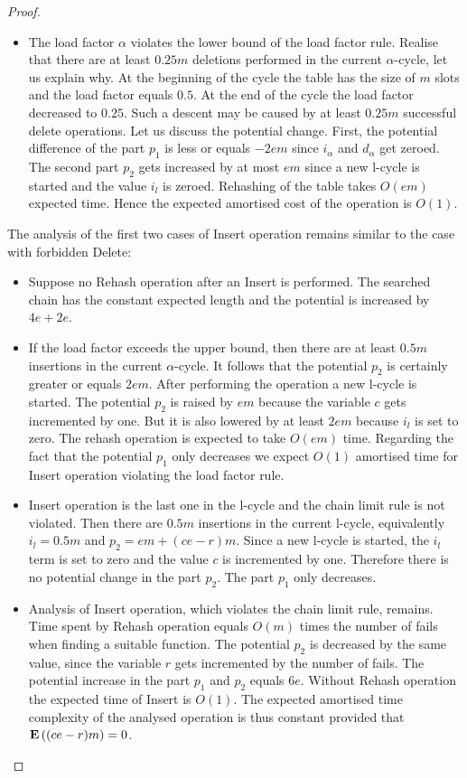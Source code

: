 \begin{proof}
\begin{itemize}
\item The load factor $\alpha$ violates the lower bound of the load factor rule. Realise that there are at least $0.25 m$ deletions performed in the current $\alpha$-cycle, let us explain why. At the beginning of the cycle the table has the size of $m$ slots and the load factor equals $0.5$. At the end of the cycle the load factor decreased to $0.25$. Such a descent may be caused by at least $0.25 m$ successful delete operations. Let us discuss the potential change. First, the potential difference of the part $p_1$ is less or equals $-2em$ since $i_{\alpha}$ and $d_{\alpha}$ get zeroed. The second part $p_2$ gets increased by at most $em$ since a new l-cycle is started and the value $i_l$ is zeroed. Rehashing of the table takes $O(em)$ expected time. Hence the expected amortised cost of the operation is $O(1)$. 
\end{itemize}

The analysis of the first two cases of Insert operation remains similar to the case with forbidden Delete:
\begin{itemize}
\item Suppose no Rehash operation after an Insert is performed. The searched chain has the constant expected length and the potential is increased by $4e + 2e$.

\item If the load factor exceeds the upper bound, then there are at least $0.5m$ insertions in the current $\alpha$-cycle. It follows that the potential $p_2$ is certainly greater or equals $2em$. After performing the operation a new l-cycle is started. The potential $p_2$ is raised by $em$ because the variable $c$ gets incremented by one. But it is also lowered by at least $2em$ because $i_l$ is set to zero. The rehash operation is expected to take $O(em)$ time. Regarding the fact that the potential $p_1$ only decreases we expect $O(1)$ amortised time for Insert operation violating the load factor rule.

\item Insert operation is the last one in the l-cycle and the chain limit rule is not violated. Then there are $0.5 m$ insertions in the current l-cycle, equivalently $i_l = 0.5m$ and $p_2 = em + (ce - r)m$. Since a new l-cycle is started, the $i_l$ term is set to zero and the value $c$ is incremented by one. Therefore there is no potential change in the part $p_2$. The part $p_1$ only decreases.

\item Analysis of Insert operation, which violates the chain limit rule, remains. Time spent by Rehash operation equals $O(m)$ times the number of fails when finding a suitable function. The potential $p_2$ is decreased by the same value, since the variable $r$ gets incremented by the number of fails. The potential increase in the part $p_1$ and $p_2$ equals $6e$. Without Rehash operation the expected time of Insert is $O(1)$. The expected amortised time complexity of the analysed operation is thus constant provided that $\mathbf{E}\left((ce - r)m\right) = 0$.


\end{itemize}
\end{proof}
